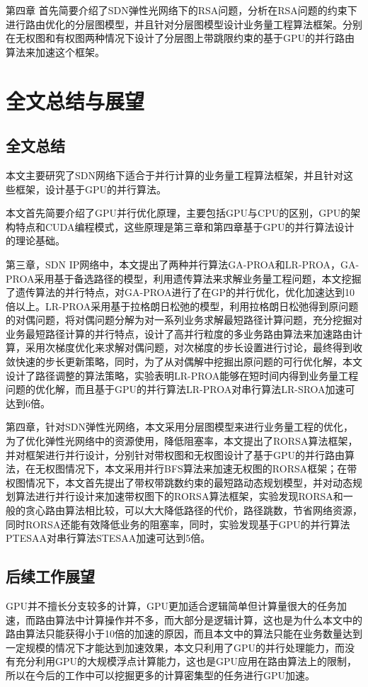 \documentclass[master]{thesis-uestc}
\begin{document}
第四章 首先简要介绍了SDN弹性光网络下的RSA问题，分析在RSA问题的约束下进行路由优化的分层图模型，并且针对分层图模型设计业务量工程算法框架。分别在无权图和有权图两种情况下设计了分层图上带跳限约束的基于GPU的并行路由算法来加速这个框架。



\chapter{全文总结与展望}
\section{全文总结}
本文主要研究了SDN网络下适合于并行计算的业务量工程算法框架，并且针对这些框架，设计基于GPU的并行算法。

本文首先简要介绍了GPU并行优化原理，主要包括GPU与CPU的区别，GPU的架构特点和CUDA编程模式，这些原理是第三章和第四章基于GPU的并行算法设计的理论基础。

第三章，SDN IP网络中，本文提出了两种并行算法GA-PROA和LR-PROA，GA-PROA采用基于备选路径的模型，利用遗传算法来求解业务量工程问题，本文挖掘了遗传算法的并行特点，对GA-PROA进行了在GP的并行优化，优化加速达到10倍以上。LR-PROA采用基于拉格朗日松弛的模型，利用拉格朗日松弛得到原问题的对偶问题，将对偶问题分解为对一系列业务求解最短路径计算问题，充分挖掘对业务最短路径计算的并行特点，设计了高并行粒度的多业务路由算法来加速路由计算，采用次梯度优化来求解对偶问题，对次梯度的步长设置进行讨论，最终得到收敛快速的步长更新策略，同时，为了从对偶解中挖掘出原问题的可行优化解，本文设计了路径调整的算法策略，实验表明LR-PROA能够在短时间内得到业务量工程问题的优化解，而且基于GPU的并行算法LR-PROA对串行算法LR-SROA加速可达到6倍。

第四章，针对SDN弹性光网络，本文采用分层图模型来进行业务量工程的优化，为了优化弹性光网络中的资源使用，降低阻塞率，本文提出了RORSA算法框架，并对框架进行并行设计，分别针对带权图和无权图设计了基于GPU的并行路由算法，在无权图情况下，本文采用并行BFS算法来加速无权图的RORSA框架；在带权图情况下，本文首先提出了带权带跳数约束的最短路动态规划模型，并对动态规划算法进行并行设计来加速带权图下的RORSA算法框架，实验发现RORSA和一般的贪心路由算法相比较，可以大大降低路径的代价，路径跳数，节省网络资源，同时RORSA还能有效降低业务的阻塞率，同时，实验发现基于GPU的并行算法PTESAA对串行算法STESAA加速可达到5倍。

\section{后续工作展望}
GPU并不擅长分支较多的计算，GPU更加适合逻辑简单但计算量很大的任务加速，而路由算法中计算操作并不多，而大部分是逻辑计算，这也是为什么本文中的路由算法只能获得小于10倍的加速的原因，而且本文中的算法只能在业务数量达到一定规模的情况下才能达到加速效果，本文只利用了GPU的并行处理能力，而没有充分利用GPU的大规模浮点计算能力，这也是GPU应用在路由算法上的限制，所以在今后的工作中可以挖掘更多的计算密集型的任务进行GPU加速。
\end{document}
